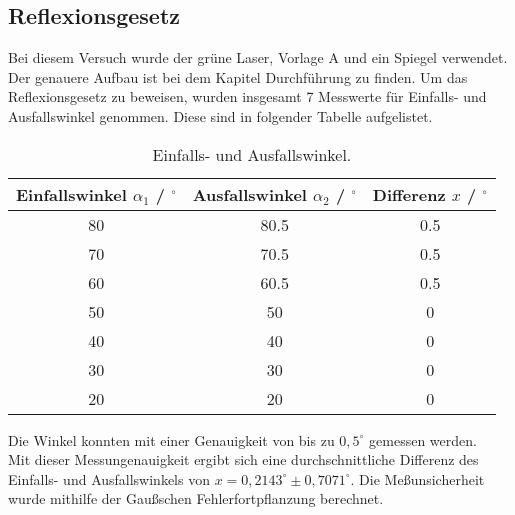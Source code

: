 \subsection{Reflexionsgesetz}
Bei diesem Versuch wurde der grüne Laser, Vorlage A und ein Spiegel verwendet. Der genauere Aufbau ist bei dem Kapitel Durchführung zu finden.
Um das Reflexionsgesetz zu beweisen, wurden insgesamt 7 Messwerte für Einfalls- und Ausfallswinkel genommen. Diese sind in folgender Tabelle
aufgelistet.
\begin{table}
  \centering
  \caption{Einfalls- und Ausfallswinkel.}
  \label{tab:Aufgabe1}
  \begin{tabular}{c c c}
    \toprule
    Einfallswinkel $\alpha_1$ / $^{\circ}$& Ausfallswinkel $\alpha_2$ / $^{\circ}$ & Differenz $x$ / $^{\circ}$\\
    \midrule
    80 & 80.5 & 0.5 \\
    70 & 70.5 & 0.5\\
    60  &60.5 & 0.5\\
    50  &50 & 0\\
    40 & 40 & 0\\
    30 & 30 & 0\\
    20 & 20 & 0\\
    \bottomrule
  \end{tabular}
\end{table}
Die Winkel konnten mit einer Genauigkeit von bis zu $0,5^{\circ}$ gemessen werden. \\
Mit dieser Messungenauigkeit ergibt sich eine durchschnittliche Differenz des Einfalls- und
Ausfallswinkels von $x = 0,2143^{\circ} \pm 0,7071^{\circ}$. Die Meßunsicherheit wurde mithilfe der Gaußschen Fehlerfortpflanzung berechnet.